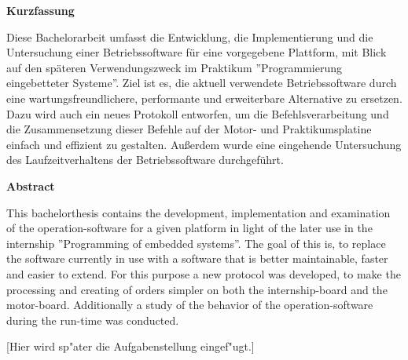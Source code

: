 \documentclass[11pt,twoside]{scrbook}
\begin{document}

\centerline{\bf Kurzfassung}

Diese Bachelorarbeit umfasst die Entwicklung, die Implementierung und die Untersuchung einer
Betriebssoftware für eine vorgegebene Plattform, mit Blick auf den späteren Verwendungszweck
im Praktikum ''Programmierung eingebetteter Systeme''. Ziel ist es, die aktuell verwendete
Betriebssoftware durch eine wartungsfreundlichere, performante und erweiterbare Alternative zu
ersetzen. Dazu wird auch ein neues Protokoll entworfen, um die Befehlsverarbeitung und
die Zusammensetzung dieser Befehle auf der Motor- und Praktikumsplatine einfach und effizient
zu gestalten. Außerdem wurde eine eingehende Untersuchung des Laufzeitverhaltens der
Betriebssoftware durchgeführt.

%
\vskip 3cm
%

\centerline{\bf Abstract}

This bachelorthesis contains the development, implementation and examination of the
operation-software for a given platform in light of the later use in the internship
''Programming of embedded systems''. The goal of this is, to replace the software
currently in use with a software that is better maintainable, faster and easier to
extend. For this purpose a new protocol was developed, to make the processing and
creating of orders simpler on both the internship-board and the motor-board.
Additionally a study of the behavior of the operation-software during the run-time was
conducted.

\cleardoublepage

\vspace*{7cm}
\centerline{[Hier wird sp"ater die Aufgabenstellung eingef"ugt.]}




\tableofcontents		%
\cleardoublepage
\listoffigures			%
\cleardoublepage
\listoftables			%
\cleardoublepage



\setcounter{page}{0}

\pagestyle{headings}



\cleardoublepage


\cleardoublepage
\end{document}
